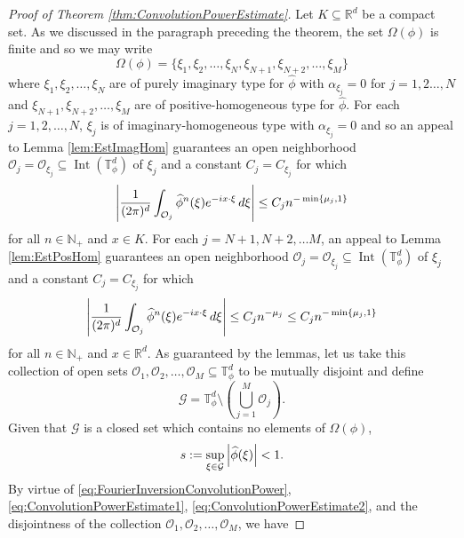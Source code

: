 \documentclass[11pt]{article}
\theoremstyle{remark}
\newcommand\Interior{\operatorname{Int}}
\begin{document}
\begin{proof}[Proof of Theorem \ref{thm:ConvolutionPowerEstimate}]
Let $K\subseteq\mathbb{R}^d$ be a compact set. As we discussed in the paragraph preceding the theorem, the set $\Omega(\phi)$ is finite and so we may write
\begin{equation*}
    \Omega(\phi)=\{\xi_1,\xi_2,\dots,\xi_N,\xi_{N+1},\xi_{N+2},\dots,\xi_M\}
\end{equation*}
where $\xi_1,\xi_2,\dots,\xi_N$ are of purely imaginary type for $\widehat{\phi}$ with $\alpha_{\xi_j}=0$ for $j=1,2\dots,N$ and $\xi_{N+1},\xi_{N+2},\dots,\xi_M$ are of positive-homogeneous type for $\widehat{\phi}$. For each $j=1,2,\dots,N$, $\xi_j$ is of imaginary-homogeneous type with $\alpha_{\xi_j}=0$ and so an appeal to Lemma \ref{lem:EstImagHom} guarantees an open neighborhood $\mathcal{O}_j=\mathcal{O}_{\xi_j}\subseteq\Interior(\mathbb{T}_\phi^d)$ of $\xi_j$ and a constant $C_j=C_{\xi_j}$ for which
\begin{equation}\label{eq:ConvolutionPowerEstimate1}
    \abs{\frac{1}{(2\pi)^d}\int_{\mathcal{O}_j}\widehat{\phi}^n(\xi)e^{-ix\cdot\xi}\,d\xi}\leq C_j n^{-\min\{\mu_j,1\}}
\end{equation}
for all $n\in\mathbb{N}_+$ and $x\in K$. For each $j=N+1,N+2,\dots M$, an appeal to Lemma \ref{lem:EstPosHom} guarantees an open neighborhood $\mathcal{O}_j=\mathcal{O}_{\xi_j}\subseteq\Interior(\mathbb{T}_\phi^d)$ of $\xi_j$ and a constant $C_j=C_{\xi_j}$ for which 
\begin{equation}\label{eq:ConvolutionPowerEstimate2}
        \abs{\frac{1}{(2\pi)^d}\int_{\mathcal{O}_j}\widehat{\phi}^n(\xi)e^{-ix\cdot\xi}\,d\xi}\leq C_jn^{-\mu_j}\leq C_j n^{-\min\{\mu_j,1\}}
\end{equation}
for all $n\in\mathbb{N}_+$ and $x\in\mathbb{R}^d$. As guaranteed by the lemmas, let us take this collection of open sets $\mathcal{O}_1,\mathcal{O}_2,\dots,\mathcal{O}_M\subseteq\mathbb{T}_{\phi}^d$ to be mutually disjoint and define
\begin{equation}
    \mathcal{G}=\mathbb{T}_{\phi}^d\setminus\left(\bigcup_{j=1}^M \mathcal{O}_j\right).
\end{equation}
Given that $\mathcal{G}$ is a closed set which contains no elements of $\Omega(\phi)$,
\begin{equation*}
s:=\sup_{\xi\in\mathcal{G}}\abs{\widehat{\phi}(\xi)}<1.
\end{equation*}
By virtue of \eqref{eq:FourierInversionConvolutionPower}, \eqref{eq:ConvolutionPowerEstimate1}, \eqref{eq:ConvolutionPowerEstimate2}, and the disjointness of the collection $\mathcal{O}_1,\mathcal{O}_2,\dots,\mathcal{O}_M$, we have

\end{proof}
\end{document}
